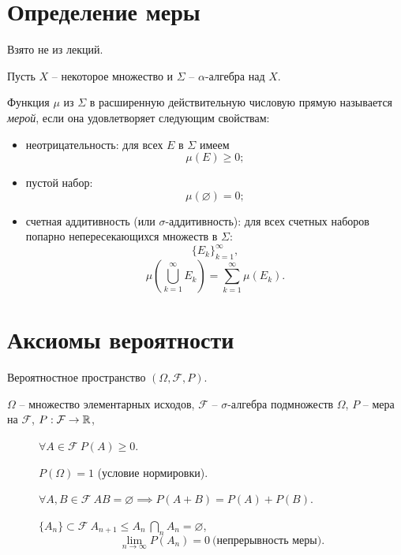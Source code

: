\newpage

\section{Определение меры}

\begin{note}
	Взято не из лекций.
\end{note}

\begin{definition}[Мера]
	Пусть $X$ -- некоторое множество и $\Sigma $ -- $\alpha $-алгебра над $X$.

	Функция $\mu $ из $\Sigma $ в расширенную действительную числовую прямую называется \emph{мерой}, если она удовлетворяет следующим свойствам:
	\begin{itemize}
		\item неотрицательность: для всех $E$ в $\Sigma $ имеем
		      \[
			      \mu (E) \geqslant 0 ;
		      \]
		\item пустой набор:
		      \[
			      \mu (\varnothing ) = 0 ;
		      \]
		\item счетная аддитивность (или $\sigma $-аддитивность): для всех счетных наборов попарно непересекающихся множеств в $\Sigma $:
		      \[
			      \{E_k\}_{k=1}^{\infty},
		      \]
		      \[
			      \mu \left(\bigcup_{k=1}^{\infty}E_k\right) = \sum_{k=1}^{\infty} \mu (E_k).
		      \]
	\end{itemize}
\end{definition}

\section{Аксиомы вероятности}

\begin{definition}
	Вероятностное пространство $(\Omega , \mathcal{F}, P)$.

	$\Omega $ -- множество элементарных исходов, $\mathcal{F}$ -- $\sigma $-алгебра подмножеств $\Omega $, $P$ -- мера на $\mathcal{F}$, $P: \mathcal{F} \rightarrow \mathbb{R}$,
	\begin{description}
		\item[] $\forall A \in \mathcal{F} \ P(A) \geqslant 0$.
		\item[] $P(\Omega ) = 1$ (условие нормировки).
		\item[] $\forall A,B \in \mathcal{F} \ AB = \varnothing \implies P(A+B) = P(A) + P(B)$.
		\item[] $\{A_n\} \subset \mathcal{F} \ A_{n+1} \leqslant A_n \ \underset{n}{\bigcap} A_n = \varnothing $,
		      \[
			      \underset{n \rightarrow \infty}{\lim}P(A_n) = 0 \ \text{(непрерывность меры)}.
		      \]
	\end{description}
\end{definition}

